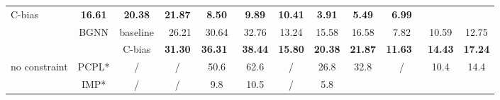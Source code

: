 \documentclass[runningheads]{llncs}
\begin{document}
\begin{table}[!t]
{\begin{tabular}{lccccccccccc}
      C-bias                                      & \textbf{16.61}                             & \textbf{20.38}
                                                  & \textbf{21.87}                             & \textbf{8.50}          & \textbf{9.89}  &
      \textbf{\textbf{10.41}}                     & \textbf{3.91}                              & \textbf{\textbf{5.49}} &
      \textbf{\textbf{6.99}}                                                                                                               \\
      \cline{2-12}
                                                  & \multirow{2}{*}{BGNN\cite{bgnn}}
                                                  & baseline                                   & ~26.21                 & 30.64
                                                  & 32.76                                      & 13.24                  & 15.58
                                                  & 16.58                                      & 7.82                   & 10.59          &
      12.75                                                                                                                                \\
                                                  &                                            &
      C-bias                                      & \textbf{31.30}                             &
      \textbf{\textbf{36.31}}~                    & \textbf{\textbf{38.44}}                    & \textbf{15.80}         &
      \textbf{\textbf{20.38}}                     & \textbf{\textbf{21.87}}                    & \textbf{11.63~}        &
      \textbf{\textbf{14.43}}                     & \textbf{\textbf{17.24}}                                                                \\
      \hline
      \multirow{8}{*}{no constraint}              & PCPL*                                      &
      /                                           & /                                          & 50.6
                                                  & 62.6                                       & /                      & 26.8           &
      32.8                                        & /                                          & 10.4                   & 14.4
      \\
                                                  & IMP*                                       &
      /                                           & /                                          & 9.8
                                                  & 10.5                                       & /                      & 5.8            &

\end{tabular}}
\end{table}
\end{document}
